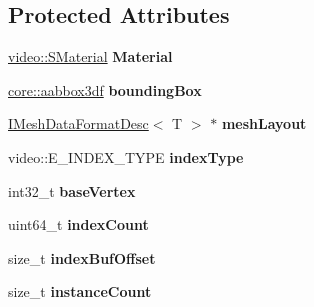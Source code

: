 \subsection*{Protected Attributes}
\begin{DoxyCompactItemize}
\item 
\hyperlink{classirr_1_1video_1_1SMaterial}{video\+::\+S\+Material} {\bfseries Material}\hypertarget{classirr_1_1scene_1_1IMeshBuffer_a68ef6f0ebfba22e338068271e9dbaefd}{}\label{classirr_1_1scene_1_1IMeshBuffer_a68ef6f0ebfba22e338068271e9dbaefd}

\item 
\hyperlink{namespaceirr_1_1core_adfc8fa01b30044c55f3332a1d6c1aa19}{core\+::aabbox3df} {\bfseries bounding\+Box}\hypertarget{classirr_1_1scene_1_1IMeshBuffer_a3878604f531bede20dd859c8779f9246}{}\label{classirr_1_1scene_1_1IMeshBuffer_a3878604f531bede20dd859c8779f9246}

\item 
\hyperlink{classirr_1_1scene_1_1IMeshDataFormatDesc}{I\+Mesh\+Data\+Format\+Desc}$<$ T $>$ $\ast$ {\bfseries mesh\+Layout}\hypertarget{classirr_1_1scene_1_1IMeshBuffer_adbf6974b2807e62d7f8de703a3a0c821}{}\label{classirr_1_1scene_1_1IMeshBuffer_adbf6974b2807e62d7f8de703a3a0c821}

\item 
video\+::\+E\+\_\+\+I\+N\+D\+E\+X\+\_\+\+T\+Y\+PE {\bfseries index\+Type}\hypertarget{classirr_1_1scene_1_1IMeshBuffer_af9d6815073725a6a003846648c63dfc1}{}\label{classirr_1_1scene_1_1IMeshBuffer_af9d6815073725a6a003846648c63dfc1}

\item 
int32\+\_\+t {\bfseries base\+Vertex}\hypertarget{classirr_1_1scene_1_1IMeshBuffer_a1e0345abd78dadd2235e2e9671bede1f}{}\label{classirr_1_1scene_1_1IMeshBuffer_a1e0345abd78dadd2235e2e9671bede1f}

\item 
uint64\+\_\+t {\bfseries index\+Count}\hypertarget{classirr_1_1scene_1_1IMeshBuffer_a8c611fb2c87c764765cb2db2123dda72}{}\label{classirr_1_1scene_1_1IMeshBuffer_a8c611fb2c87c764765cb2db2123dda72}

\item 
size\+\_\+t {\bfseries index\+Buf\+Offset}\hypertarget{classirr_1_1scene_1_1IMeshBuffer_ad40066414da2a21a3ab9f62a3bf5f41f}{}\label{classirr_1_1scene_1_1IMeshBuffer_ad40066414da2a21a3ab9f62a3bf5f41f}

\item 
size\+\_\+t {\bfseries instance\+Count}\hypertarget{classirr_1_1scene_1_1IMeshBuffer_a2edd6467d896cacf0782e9ed62b50712}{}\label{classirr_1_1scene_1_1IMeshBuffer_a2edd6467d896cacf0782e9ed62b50712}


\end{DoxyCompactItemize}

